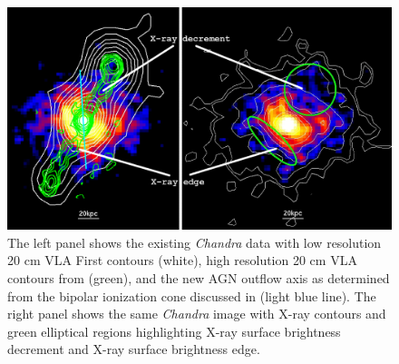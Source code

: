 \documentclass[letterpaper,11pt,twocolumn]{article}
\begin{document}
\begin{figure}
\includegraphics[scale=0.22]{chan_vla_utrao}
\caption{The left panel shows the
existing {\textit{Chandra}} data with low resolution
20 cm VLA First contours (white), high resolution 20 cm VLA contours
from \cite{1993ApJ...415...82H} (green), and the new AGN outflow axis as
determined from the bipolar ionization cone discussed in 
\cite{1999ApJ...512..145H} (light blue line). The right panel shows the same
{\textit{Chandra}} image with X-ray contours and 
green elliptical regions highlighting X-ray surface brightness decrement and X-ray
surface brightness edge.}
\label{fig:chanrad}
\end{figure}
\end{document}
